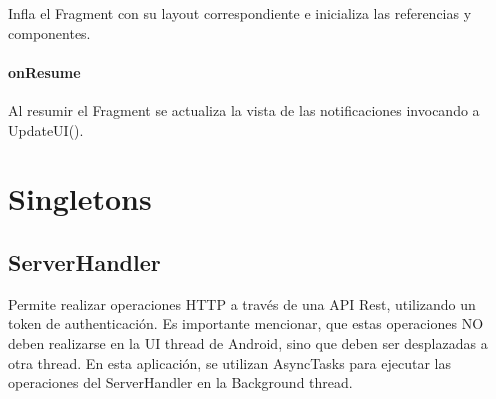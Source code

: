 \documentclass[letterpaper,10pt,english]{sphinxmanual}
\begin{document}
\begin{fulllineitems}
\label{Fragments/NotificationsFragment:com.fiuba.tallerii.jobify.NotificationsFragment.onCreateView(LayoutInflater, ViewGroup, Bundle)}
Infla el Fragment con su layout correspondiente e inicializa las referencias y componentes.

\end{fulllineitems}



\subsubsection{onResume}
\label{Fragments/NotificationsFragment:onresume}

\begin{fulllineitems}
\label{Fragments/NotificationsFragment:com.fiuba.tallerii.jobify.NotificationsFragment.onResume()}
Al resumir el Fragment se actualiza la vista de las notificaciones invocando a UpdateUI().

\end{fulllineitems}



\chapter{Singletons}
\label{Singletons/package-index:singletons}\label{Singletons/package-index::doc}

\section{ServerHandler}
\label{Singletons/ServerHandler:serverhandler}\label{Singletons/ServerHandler::doc}

\begin{fulllineitems}
\label{Singletons/ServerHandler:com.fiuba.tallerii.jobify.ServerHandler}
Permite realizar operaciones HTTP a través de una API Rest, utilizando un token de authenticación.
Es importante mencionar, que estas operaciones NO deben realizarse en la UI thread de Android, sino que deben ser desplazadas a otra thread. En esta aplicación, se utilizan AsyncTasks para ejecutar las operaciones del ServerHandler en la Background thread.

\end{fulllineitems}
\end{document}
